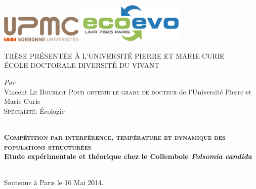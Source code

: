 
\begin{titlingpage}
\begin{Spacing}{1}
\begin{center}     

\includegraphics[width=0.3\textwidth]{0_Title/upmc.png}\hfill
\includegraphics[width=0.4\textwidth]{0_Title/LogoLabo.png}\\[3cm]
 
 \vfill
 
\begin{Spacing}{1.5}
\textsc{\Huge THÈSE PRÉSENTÉE À L'UNIVERSITÉ PIERRE ET MARIE
CURIE}\\[0.8cm]

\textsc{\LARGE ÉCOLE DOCTORALE DIVERSITÉ DU VIVANT}
\end{Spacing} 
\vfill

\emph{Par}\\ 
\Large Vincent \textsc{Le Bourlot} \vfill
\textsc{Pour obtenir le grade de docteur} de l'Université Pierre et Marie
Curie\\
\textsc{Spécialité}: \'Ecologie\\

\vfill


\HRule \\[0.2cm] 
{\textbf{\Huge\textsc{Compétition par interférence, température et dynamique
des populations structurées}\\[0.7cm] \LARGE Etude expérimentale et théorique
chez le Collembole \textit{Folsomia candida}}}\\[0.2cm] \HRule \\ 

\vfill
\end{center} 
Soutenue à Paris le 16 Mai 2014.\\
\vfill

\begin{flushleft}
\begingroup
    \fontsize{11pt}{12pt}\selectfont



\end{flushleft}
\end{Spacing}
\end{titlingpage}
